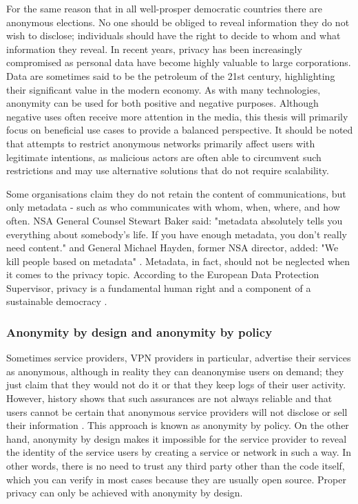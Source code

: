 For the same reason that in all well-prosper democratic countries there are anonymous elections. No one should be obliged to reveal information they do not wish to disclose; individuals should have the right to decide to whom and what information they reveal. In recent years, privacy has been increasingly compromised as personal data have become highly valuable to large corporations. Data are sometimes said to be the petroleum of the 21st century, highlighting their significant value in the modern economy.
As with many technologies, anonymity can be used for both positive and negative purposes. Although negative uses often receive more attention in the media, this thesis will primarily focus on beneficial use cases to provide a balanced perspective.
It should be noted that attempts to restrict anonymous networks primarily affect users with legitimate intentions, as malicious actors are often able to circumvent such restrictions and may use alternative solutions that do not require scalability.

Some organisations claim they do not retain the content of communications, but only metadata - such as who communicates with whom, when, where, and how often. NSA General Counsel Stewart Baker said: "metadata absolutely tells you everything about somebody’s life. If you have enough metadata, you don’t really need content." and General Michael Hayden, former NSA director, added: "We kill people based on metadata" \cite{metadata-kill}. Metadata, in fact, should not be neglected when it comes to the privacy topic.
According to the European Data Protection Supervisor, privacy is a fundamental human right and a component of a sustainable democracy \cite{privacy-eu}.

\subsubsection{Anonymity by design and anonymity by policy}
Sometimes service providers, VPN providers in particular, advertise their services as anonymous, although in reality they can deanonymise users on demand; they just claim that they would not do it or that they keep logs of their user activity. However, history shows that such assurances are not always reliable and that users cannot be certain that anonymous service providers will not disclose or sell their information \cite{vpns}. This approach is known as anonymity by policy.
On the other hand, anonymity by design makes it impossible for the service provider to reveal the identity of the service users by creating a service or network in such a way. In other words, there is no need to trust any third party other than the code itself, which you can verify in most cases because they are usually open source. Proper privacy can only be achieved with anonymity by design.

